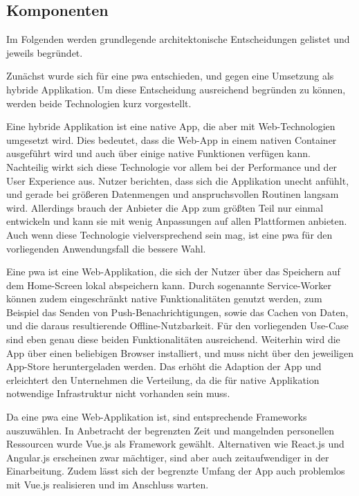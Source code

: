 \subsection{Komponenten}

Im Folgenden werden grundlegende architektonische Entscheidungen gelistet und jeweils begründet.

Zunächst wurde sich für eine \gls{pwa} entschieden, und gegen eine Umsetzung als hybride Applikation. Um diese Entscheidung ausreichend begründen zu können, werden beide Technologien kurz vorgestellt.

Eine hybride Applikation ist eine native App, die aber mit Web-Technologien umgesetzt wird. Dies bedeutet, dass die Web-App in einem nativen Container ausgeführt wird und auch über einige native Funktionen verfügen kann. Nachteilig wirkt sich diese Technologie vor allem bei der Performance und der User Experience aus. Nutzer berichten, dass sich die Applikation unecht anfühlt, und gerade bei größeren Datenmengen und anspruchsvollen Routinen langsam wird. Allerdings brauch der Anbieter die App zum größten Teil nur einmal entwickeln und kann sie mit wenig Anpassungen auf allen Plattformen anbieten. Auch wenn diese Technologie vielversprechend sein mag, ist eine \gls{pwa} für den vorliegenden Anwendungsfall die bessere Wahl.

Eine \gls{pwa} ist eine Web-Applikation, die sich der Nutzer über das Speichern auf dem Home-Screen lokal abspeichern kann. Durch sogenannte Service-Worker können zudem eingeschränkt native Funktionalitäten genutzt werden, zum Beispiel das Senden von Push-Benachrichtigungen, sowie das Cachen von Daten, und die daraus resultierende Offline-Nutzbarkeit. Für den vorliegenden Use-Case sind eben genau diese beiden Funktionalitäten ausreichend. Weiterhin wird die App über einen beliebigen Browser installiert, und muss nicht über den jeweiligen App-Store heruntergeladen werden. Das erhöht die Adaption der App und erleichtert den Unternehmen die Verteilung, da die für native Applikation notwendige Infrastruktur nicht vorhanden sein muss.

Da eine \gls{pwa} eine Web-Applikation ist, sind entsprechende Frameworks auszuwählen. In Anbetracht der begrenzten Zeit und mangelnden personellen Ressourcen wurde Vue.js als Framework gewählt. Alternativen wie React.js und Angular.js erscheinen zwar mächtiger, sind aber auch zeitaufwendiger in der Einarbeitung. Zudem lässt sich der begrenzte Umfang der App auch problemlos mit Vue.js realisieren und im Anschluss warten.

